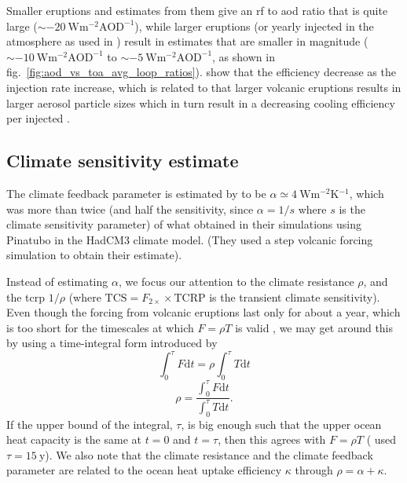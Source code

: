 \documentclass{ametsocV6.1}
\newcommand{\iso}[1][i]{{#1}njected \ce{SO2}}
\begin{document}
Smaller eruptions and estimates from them give an \gls{rf} to \gls{aod} ratio that is
quite large (\(\sim \SI{-20}{\watt\metre^{-2}\mathrm{AOD}^{-1}}\)), while larger
eruptions (or yearly \iso{} in the atmosphere as used in \citet{niemeier2015}) result in
estimates that are smaller in magnitude (\(\sim
\SI{-10}{\watt\metre^{-2}\mathrm{AOD}^{-1}}\) to \(\sim
\SI{-5}{\watt\metre^{-2}\mathrm{AOD}^{-1}}\), as shown in
fig.~\ref{fig:aod_vs_toa_avg_loop_ratios}). \citet{niemeier2017} show that the
efficiency decrease as the injection rate increase, which is related to
that larger volcanic eruptions results in larger aerosol particle sizes which in turn
result in a decreasing cooling efficiency per \iso{} \citep{english2013, timmreck2018}.

\subsection{Climate sensitivity estimate}


The climate feedback parameter is estimated by \citet{jones2005} to be \(\alpha \simeq
\SI{4}{\watt\metre^{-2}\kelvin^{-1}}\), which was more than twice (and half the
sensitivity, since \(\alpha =1/s\) where \(s\) is the climate sensitivity parameter) of
what \citet{gregory2016} obtained in their simulations using Pinatubo in the HadCM3
climate model. (They used a step volcanic forcing simulation to obtain their estimate).

Instead of estimating \(\alpha \), we focus our attention to the climate resistance
\(\rho \), and the \gls{tcrp} \(1/\rho\) (where \(\mathrm{TCS}=F_{2\times}\times
\mathrm{TCRP}\) is the transient climate sensitivity). Even though the forcing from
volcanic eruptions last only for about a year, which is too short for the timescales at
which \(F=\rho T\) is valid \citep{gregory2016}, we may get around this by using a
time-integral form introduced by \citet{merlis2014}
\begin{equation}
  \int_0^{\tau}F \mathrm{d}t=\rho\int_{0}^{\tau}T \mathrm{d}t
\end{equation}
\begin{equation}
  \rho=\frac{\int_0^{\tau}F \mathrm{d}t}{\int_{0}^{\tau}T \mathrm{d}t}.
  \label{eq:climate-resistance}
\end{equation}
%
If the upper bound of the integral, \(\tau \), is big enough such that the upper ocean
heat capacity is the same at \(t=0\) and \(t=\tau \), then this agrees with \(F=\rho T\)
\citep{gregory2016} (\citet{merlis2014} used \(\tau =\SI{15}{\mathrm{y}}\)). We also
note that the climate resistance and the climate feedback parameter are related to the
ocean heat uptake efficiency \(\kappa \) through \(\rho =\alpha +\kappa \).
\end{document}
